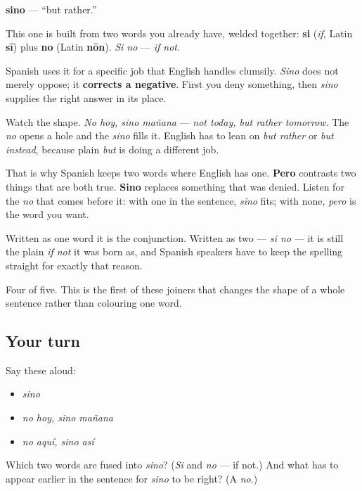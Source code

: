 \begin{cousinweb}
\textbf{sino} — \textquotedblleft{}but rather.\textquotedblright{}

This one is built from two words you already have, welded together: \textbf{si} (\emph{if}, Latin \textbf{sī}) plus \textbf{no} (Latin \textbf{nōn}). \emph{Si no} — \emph{if not}.

Spanish uses it for a specific job that English handles clumsily. \emph{Sino} does not merely oppose; it \textbf{corrects a negative}. First you deny something, then \emph{sino} supplies the right answer in its place.

Watch the shape. \emph{No hoy, sino mañana} — \emph{not today, but rather tomorrow}. The \emph{no} opens a hole and the \emph{sino} fills it. English has to lean on \emph{but rather} or \emph{but instead}, because plain \emph{but} is doing a different job.

That is why Spanish keeps two words where English has one. \textbf{Pero} contrasts two things that are both true. \textbf{Sino} replaces something that was denied. Listen for the \emph{no} that comes before it: with one in the sentence, \emph{sino} fits; with none, \emph{pero} is the word you want.

Written as one word it is the conjunction. Written as two — \emph{si no} — it is still the plain \emph{if not} it was born as, and Spanish speakers have to keep the spelling straight for exactly that reason.
\end{cousinweb}

\begin{grammarlens}[title={What you've built}]
Four of five. This is the first of these joiners that changes the shape of a whole sentence rather than colouring one word.
\end{grammarlens}

\subsection*{Your turn}
Say these aloud:

\begin{itemize}
\raggedright
  \item \emph{sino}
  \item \emph{no hoy, sino mañana}
  \item \emph{no aquí, sino así}
\end{itemize}

\begin{tcolorbox}[breakable,colback=teal!4,colframe=teal!35!black,title={Before you move on}]
Which two words are fused into \emph{sino}? (\emph{Si} and \emph{no} — if not.) And what has to appear earlier in the sentence for \emph{sino} to be right? (A \emph{no}.)
\end{tcolorbox}
